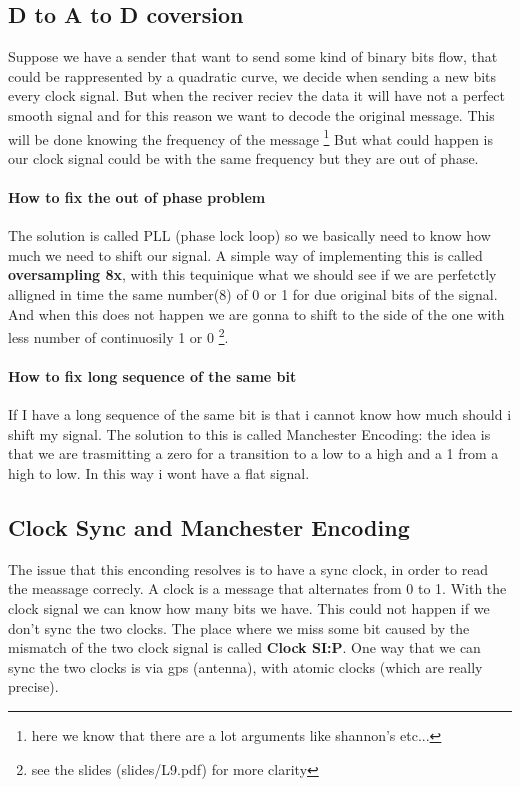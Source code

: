 \documentclass{article}
\begin{document}
    \subsection{D to A to D coversion}
      Suppose we have a sender that want to send some kind of binary bits flow, that could be 
      rappresented by a quadratic curve, we decide when sending a new bits every clock signal.
      But when the reciver reciev the data it will have not a perfect smooth signal and for
      this reason we want to decode the original message. This will be done knowing the frequency
      of the message \footnote{here we know that there are a lot arguments like shannon's etc...}
      But what could happen is our clock signal could be with the same frequency but they are 
      out of phase.
      \paragraph{How to fix the out of phase problem} The solution is called PLL (phase lock loop)
        so we basically need to know how much we need to shift our signal. A simple way of implementing
        this is called \textbf{oversampling 8x}, with this tequinique what we should see if we are
        perfetctly alligned in time the same number(8) of 0 or 1 for due original bits of the signal. 
        And when this does not happen we are gonna to shift to the side of the one with less number
        of continuosily 1 or 0 \footnote{see the slides (slides/L9.pdf) for more clarity}.
      \paragraph{How to fix long sequence of the same bit} If I have a long sequence of the same
        bit is that i cannot know how much should i shift my signal. The solution to this is called
        Manchester Encoding: the idea is that we are trasmitting a zero for a transition to a low
        to a high and a 1 from a high to low. In this way i wont have a flat signal. 
    \subsection{Clock Sync and Manchester Encoding}
      The issue that this enconding resolves is to have a sync clock, in order to read the 
      meassage correcly. A clock is a message that alternates from 0 to 1. With the clock
      signal we can know how many bits we have. This could not happen if we don't sync the
      two clocks. The place where we miss some bit caused by the mismatch of the two clock
      signal is called \textbf{Clock SI:P}. One way that we can sync the two clocks is via 
      gps (antenna), with atomic clocks (which are really precise).
  
\end{document}
